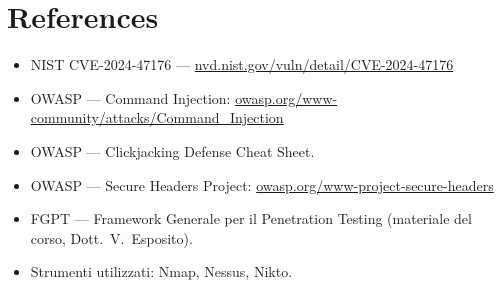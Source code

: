 \documentclass[11pt]{article}
\begin{document}
\section{References}
\begin{itemize}[leftmargin=*]
    \item NIST CVE-2024-47176 — \href{https://nvd.nist.gov/vuln/detail/CVE-2024-47176}{nvd.nist.gov/vuln/detail/CVE-2024-47176}
    \item OWASP — Command Injection: \href{https://owasp.org/www-community/attacks/Command_Injection}{owasp.org/www-community/attacks/Command\_Injection}
    \item OWASP — Clickjacking Defense Cheat Sheet.
    \item OWASP — Secure Headers Project: \href{https://owasp.org/www-project-secure-headers/}{owasp.org/www-project-secure-headers}
    \item FGPT — Framework Generale per il Penetration Testing (materiale del corso, Dott.\ V.\ Esposito).
    \item Strumenti utilizzati: Nmap, Nessus, Nikto. %
\end{itemize}
\end{document}
